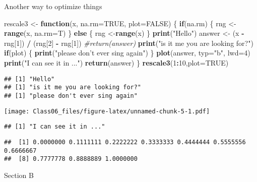 \documentclass[]{article}
\newenvironment{Shaded}{\begin{snugshade}}{\end{snugshade}}
\newcommand{\KeywordTok}[1]{\textcolor[rgb]{0.13,0.29,0.53}{\textbf{#1}}}
\newcommand{\DataTypeTok}[1]{\textcolor[rgb]{0.13,0.29,0.53}{#1}}
\newcommand{\DecValTok}[1]{\textcolor[rgb]{0.00,0.00,0.81}{#1}}
\newcommand{\StringTok}[1]{\textcolor[rgb]{0.31,0.60,0.02}{#1}}
\newcommand{\CommentTok}[1]{\textcolor[rgb]{0.56,0.35,0.01}{\textit{#1}}}
\newcommand{\OtherTok}[1]{\textcolor[rgb]{0.56,0.35,0.01}{#1}}
\newcommand{\ControlFlowTok}[1]{\textcolor[rgb]{0.13,0.29,0.53}{\textbf{#1}}}
\newcommand{\OperatorTok}[1]{\textcolor[rgb]{0.81,0.36,0.00}{\textbf{#1}}}
\newcommand{\NormalTok}[1]{#1}
\begin{document}
Another way to optimize things

\begin{Shaded}
\begin{Highlighting}[]
\NormalTok{rescale3 <-}\StringTok{ }\ControlFlowTok{function}\NormalTok{(x, }\DataTypeTok{na.rm=}\OtherTok{TRUE}\NormalTok{, }\DataTypeTok{plot=}\OtherTok{FALSE}\NormalTok{) \{}
  \ControlFlowTok{if}\NormalTok{(na.rm) \{}
\NormalTok{    rng <-}\KeywordTok{range}\NormalTok{(x, }\DataTypeTok{na.rm=}\NormalTok{T)}
\NormalTok{  \} }\ControlFlowTok{else}\NormalTok{ \{}
\NormalTok{    rng <-}\KeywordTok{range}\NormalTok{(x)}
\NormalTok{  \}}
  \KeywordTok{print}\NormalTok{(}\StringTok{"Hello"}\NormalTok{)}
\NormalTok{  answer <-}\StringTok{ }\NormalTok{(x }\OperatorTok{-}\StringTok{ }\NormalTok{rng[}\DecValTok{1}\NormalTok{]) }\OperatorTok{/}\StringTok{ }\NormalTok{(rng[}\DecValTok{2}\NormalTok{] }\OperatorTok{-}\StringTok{ }\NormalTok{rng[}\DecValTok{1}\NormalTok{])}
  \CommentTok{#return(answer)}
  \KeywordTok{print}\NormalTok{(}\StringTok{"is it me you are looking for?"}\NormalTok{)}
  \ControlFlowTok{if}\NormalTok{(plot) \{}
    \KeywordTok{print}\NormalTok{(}\StringTok{"please don't ever sing again"}\NormalTok{)}
\NormalTok{  \}}
  \KeywordTok{plot}\NormalTok{(answer, }\DataTypeTok{typ=}\StringTok{"b"}\NormalTok{, }\DataTypeTok{lwd=}\DecValTok{4}\NormalTok{)}
  \KeywordTok{print}\NormalTok{(}\StringTok{"I can see it in ..."}\NormalTok{)}
  \KeywordTok{return}\NormalTok{(answer)}
\NormalTok{\}}
\KeywordTok{rescale3}\NormalTok{(}\DecValTok{1}\OperatorTok{:}\DecValTok{10}\NormalTok{,}\DataTypeTok{plot=}\OtherTok{TRUE}\NormalTok{)}
\end{Highlighting}
\end{Shaded}

\begin{verbatim}
## [1] "Hello"
## [1] "is it me you are looking for?"
## [1] "please don't ever sing again"
\end{verbatim}

\texttt{[image: Class06\_files/figure-latex/unnamed-chunk-5-1.pdf]}

\begin{verbatim}
## [1] "I can see it in ..."
\end{verbatim}

\begin{verbatim}
##  [1] 0.0000000 0.1111111 0.2222222 0.3333333 0.4444444 0.5555556 0.6666667
##  [8] 0.7777778 0.8888889 1.0000000
\end{verbatim}

Section B
\end{document}
